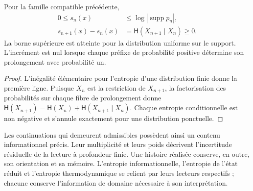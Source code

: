 \begin{proposition}
Pour la famille compatible précédente,
\begin{align}
 0\leq s_n(x)&\leq\log|\operatorname{supp}p_n|,\\
 s_{n+1}(x)-s_n(x)
 &=\mathsf H(X_{n+1}\mid X_n)\geq0.
 \label{ii:eq:ii-entropia-refinamiento}
\end{align}
La borne supérieure est atteinte pour la distribution uniforme sur le
support. L'incrément est nul lorsque chaque préfixe de probabilité
positive détermine son prolongement avec probabilité un.
\end{proposition}
\begin{proof}
L'inégalité élémentaire pour l'entropie d'une distribution finie
donne la première ligne. Puisque \(X_n\) est la restriction de \(X_{n+1}\),
la factorisation des probabilités sur chaque fibre de prolongement
donne \(\mathsf H(X_{n+1})=\mathsf H(X_n)+
\mathsf H(X_{n+1}\mid X_n)\). Chaque entropie conditionnelle est non
négative et s'annule exactement pour une distribution ponctuelle.
\end{proof}

Les continuations qui demeurent admissibles possèdent ainsi un contenu
informationnel précis. Leur multiplicité et leurs poids décrivent
l'incertitude résiduelle de la lecture à profondeur finie. Une
histoire réalisée conserve, en outre, son orientation et sa mémoire.
L'entropie informationnelle, l'entropie de l'état réduit et l'entropie
thermodynamique se relient par leurs lecteurs respectifs ; chacune
conserve l'information de domaine nécessaire à son interprétation.
